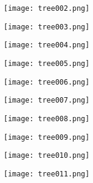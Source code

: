 \begin{frame}
\begin{figure}
    \texttt{[image: tree002.png]}
\end{figure}
\end{frame}
\begin{frame}
\begin{figure}
    \texttt{[image: tree003.png]}
\end{figure}
\end{frame}
\begin{frame}
\begin{figure}
    \texttt{[image: tree004.png]}
\end{figure}
\end{frame}
\begin{frame}
\begin{figure}
    \texttt{[image: tree005.png]}
\end{figure}
\end{frame}
\begin{frame}
\begin{figure}
    \texttt{[image: tree006.png]}
\end{figure}
\end{frame}
\begin{frame}
\begin{figure}
    \texttt{[image: tree007.png]}
\end{figure}
\end{frame}
\begin{frame}
\begin{figure}
    \texttt{[image: tree008.png]}
\end{figure}
\end{frame}
\begin{frame}
\begin{figure}
    \texttt{[image: tree009.png]}
\end{figure}
\end{frame}
\begin{frame}
\begin{figure}
    \texttt{[image: tree010.png]}
\end{figure}
\end{frame}
\begin{frame}
\begin{figure}
    \texttt{[image: tree011.png]}
\end{figure}
\end{frame}
